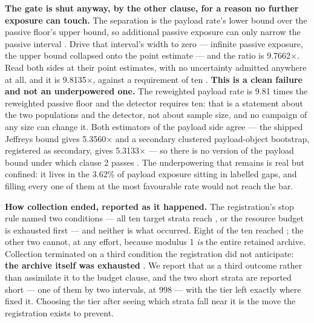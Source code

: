 \documentclass[11pt]{article}
\begin{document}
\textbf{The gate is shut anyway, by the other clause, for a reason no further exposure can touch.} The separation is the payload rate's lower bound over the passive floor's upper bound, so additional passive exposure can only narrow the passive interval%
. Drive that interval's width to zero --- infinite passive exposure, the upper bound collapsed onto the point estimate --- and the ratio is 9.7662$\times$. Read both sides at their point estimates, with no uncertainty admitted anywhere at all, and it is 9.8135$\times$, against a requirement of ten%
. \textbf{This is a clean failure and not an underpowered one.} The reweighted payload rate is 9.81 times the reweighted passive floor and the detector requires ten: that is a statement about the two populations and the detector, not about sample size, and no campaign of any size can change it. Both estimators of the payload side agree --- the shipped Jeffreys bound gives 5.3560$\times$ and a secondary clustered payload-object bootstrap, registered as secondary, gives 5.3133$\times$ --- so there is no version of the payload bound under which clause 2 passes%
. The underpowering that remains is real but confined: it lives in the 3.62\% of payload exposure sitting in labelled gaps, and filling every one of them at the most favourable rate would not reach the bar.

\textbf{How collection ended, reported as it happened.} The registration's stop rule named two conditions --- all ten target strata reach , or the resource budget is exhausted first --- and neither is what occurred. Eight of the ten reached ; the other two cannot, at any effort, because modulus 1 \emph{is} the entire retained archive. Collection terminated on a third condition the registration did not anticipate: \textbf{the archive itself was exhausted}%
. We report that as a third outcome rather than assimilate it to the budget clause, and the two short strata are reported short --- one of them by two intervals, at 998 --- with the tier left exactly where  fixed it. Choosing the tier after seeing which strata fall near it is the move the registration exists to prevent.
\end{document}
